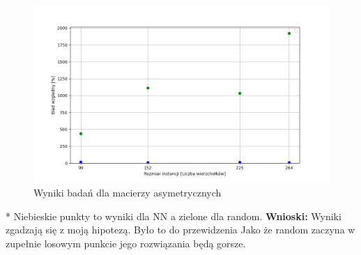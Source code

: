 \documentclass{article}
\begin{document}
        \begin{figure}[ht]
          \centering
          \includegraphics[width=\textwidth]{src/plots/symTsStartVal.png}
          \caption{Wyniki badań dla macierzy asymetrycznych}
          \label{fig:asymStartVal}
        \end{figure}
        \FloatBarrier
        * Niebieskie punkty to wyniki dla NN a zielone dla random.
        \textbf{Wnioski: } Wyniki zgadzają się z moją hipotezą. Było to do przewidzenia
        Jako że random zaczyna w zupełnie losowym punkcie jego rozwiązania będą gorsze.
\end{document}
